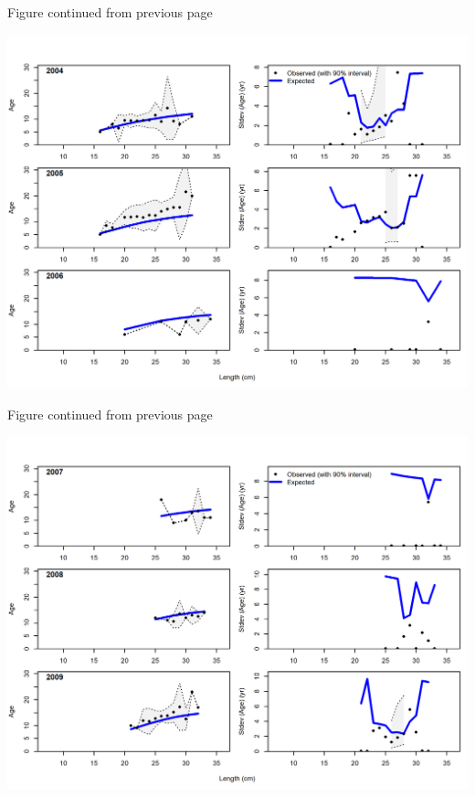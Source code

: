 \documentclass[12pt,]{article}
\begin{document}
\begin{center} 

              Figure continued from previous page 

             \end{center}

\includegraphics{./r4ss/plots_mod1/comp_condAALfit_Andre_plotsflt12mkt0_page3.png}

\begin{center} 

              Figure continued from previous page 

             \end{center}

\includegraphics{./r4ss/plots_mod1/comp_condAALfit_Andre_plotsflt12mkt0_page4.png}
\end{document}
